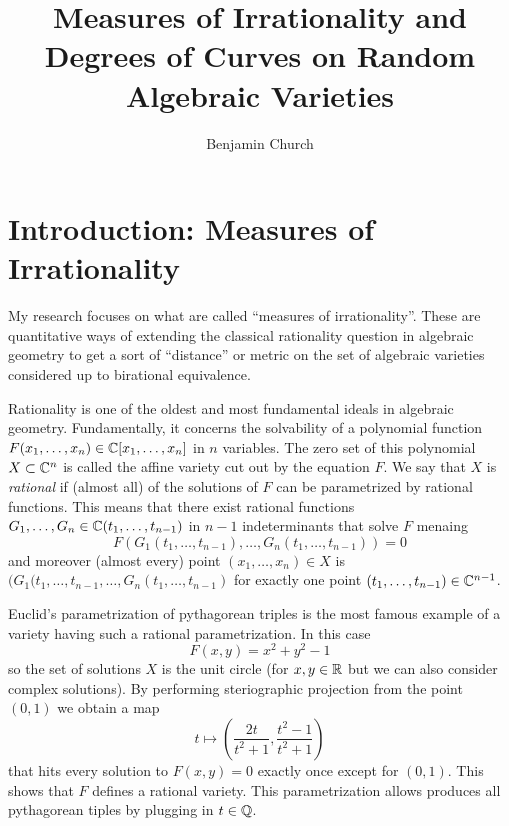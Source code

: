 \documentclass[12pt]{article}
\begin{document}
\author{Benjamin Church}
\title{\Huge Measures of Irrationality and Degrees of Curves on Random Algebraic Varieties}

\maketitle

\section{Introduction: Measures of Irrationality}

My research focuses on what are called ``measures of irrationality''. These are quantitative ways of extending the classical rationality question in algebraic geometry to get a sort of ``distance'' or metric on the set of algebraic varieties considered up to birational equivalence. 
\par 
Rationality is one of the oldest and most fundamental ideals in algebraic geometry. Fundamentally, it concerns the solvability of a polynomial function $F(x_1, \dots, x_n) \in \mathbb{C}[x_1, \dots, x_n]$ in $n$ variables. The zero set of this polynomial $X \subset \mathbb{C}^n$ is called the affine variety cut out by the equation $F$. We say that $X$ is \textit{rational} if (almost all) of the solutions of $F$ can be parametrized by rational functions. This means that there exist rational functions $G_1, \dots, G_n \in \mathbb{C}(t_1, \dots, t_{n-1})$ in $n-1$ indeterminants that solve $F$ menaing 
\[ F(G_1(t_1, \dots, t_{n-1}), \dots, G_n(t_1, \dots, t_{n-1})) = 0 \]
and moreover (almost every) point $(x_1, \dots, x_n) \in X$ is $(G_1(t_1, \dots, t_{n-1}, \dots, G_n(t_1, \dots, t_{n-1})$ for exactly one point $(t_1, \dots, t_{n-1}) \in \mathbb{C}^{n-1}$. 

\begin{example}
Euclid's parametrization of pythagorean triples is the most famous example of a variety having such a rational parametrization. In this case 
\[ F(x,y) = x^2 + y^2 - 1 \]
so the set of solutions $X$ is the unit circle (for $x,y \in \mathbb{R}$ but we can also consider complex solutions). By performing steriographic projection from the point $(0,1)$ we obtain a map
\[ t \mapsto \left( \frac{2t}{t^2 + 1}, \frac{t^2 - 1}{t^2 + 1} \right) \]
that hits every solution to $F(x,y) = 0$ exactly once except for $(0, 1)$. This shows that $F$ defines a rational variety. This parametrization allows produces all pythagorean tiples by plugging in $t \in \mathbb{Q}$.
\end{example}
\end{document}
